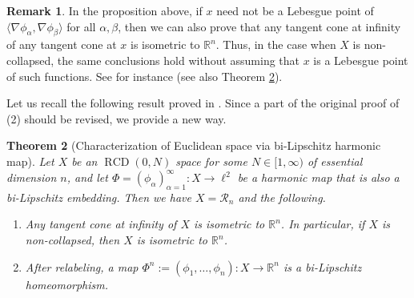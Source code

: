 \documentclass[11pt,reqno]{amsart}
\newtheorem{theorem}{Theorem}[section]
\theoremstyle{definition}
\newtheorem{remark}[theorem]{Remark}
\numberwithin{equation}{section}
\DeclareMathOperator{\RCD}{RCD}
\begin{document}
\begin{remark}\label{remnn}
    In the proposition above, if $x$ need not be a Lebesgue point of $\langle \nabla \phi_{\alpha}, \nabla \phi_{\beta}\rangle$ for all $\alpha, \beta$, then we can also prove that any tangent cone at infinity of any tangent cone at $x$ is isometric to $\mathbb{R}^n$. Thus, in the case when $X$ is non-collapsed, the same conclusions hold without assuming that $x$ is a Lebesgue point of such functions. See for instance \cite[Theorem 4.8 and Corollary 4.10]{HS} (see also Theorem \ref{asaisharsnasa}). 
\end{remark}
Let us recall the following result proved in \cite{HS}. Since a part of the original proof of (2) should be revised, we provide a new way.
\begin{theorem}[Characterization of Euclidean space via bi-Lipschitz harmonic map]\label{asaisharsnasa}
    Let $X$ be an $\RCD(0, N)$ space for some $N \in [1, \infty)$ of essential dimension $n$, and let $\Phi=(\phi_{\alpha})_{\alpha=1}^{\infty}:X \to \ell^2$ be a harmonic map that is also a  bi-Lipschitz  embedding. Then we have $X=\mathcal{R}_n$ and the following.
    \begin{enumerate}
        \item Any tangent cone at infinity of $X$ is isometric to $\mathbb{R}^n$. In particular, if $X$ is non-collapsed, then $X$ is isometric to $\mathbb{R}^n$.
        \item After relabeling, a map $\Phi^n :=(\phi_1, \ldots, \phi_n):X \to \mathbb{R}^n$ is a bi-Lipschitz homeomorphism.
    \end{enumerate}
\end{theorem}
\end{document}
